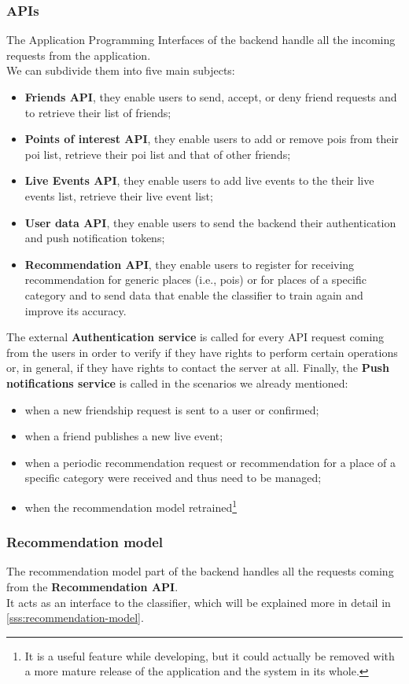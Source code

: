 \documentclass[../../main]{subfiles}
\begin{document}
\subsubsection{APIs}
The Application Programming Interfaces of the backend handle all the incoming requests from the application.\\
We can subdivide them into five main subjects:
\begin{itemize}
    \item \textbf{Friends API}, they enable users to send, accept, or deny friend requests and to retrieve their list of friends;
    \item \textbf{Points of interest API}, they enable users to add or remove pois from their poi list, retrieve their poi list and that of other friends;
    \item \textbf{Live Events API}, they enable users to add live events to the their live events list, retrieve their live event list;
    \item \textbf{User data API}, they enable users to send the backend their authentication and push notification tokens;
    \item \textbf{Recommendation API}, they enable users to register for receiving recommendation for generic places (i.e., pois) or for places of a specific category and to send data that enable the classifier to train again and improve its accuracy.
\end{itemize}
The external \textbf{Authentication service} is called for every API request coming from the users in order to verify if they have rights to perform certain operations or, in general, if they have rights to contact the server at all.
Finally, the \textbf{Push notifications service} is called in the scenarios we already mentioned:
\begin{itemize}
    \item when a new friendship request is sent to a user or confirmed;
    \item when a friend publishes a new live event;
    \item when a periodic recommendation request or recommendation for a place of a specific category were received and thus need to be managed;
    \item when the recommendation model retrained\footnote{It is a useful feature while developing, but it could actually be removed with a more mature release of the application and the system in its whole.}
\end{itemize}

\label{sss:recommendation-model}
\subsubsection{Recommendation model}
The recommendation model part of the backend handles all the requests coming from the \textbf{Recommendation API}.\\
It acts as an interface to the classifier, which will be explained more in detail in \ref{sss:recommendation-model}.
\end{document}
